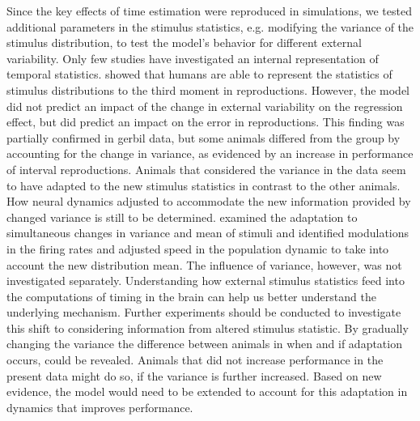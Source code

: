 \documentclass[10pt]{article}
\begin{document}
Since the key effects of time estimation were reproduced in simulations, we tested additional parameters in the stimulus statistics, e.g. modifying the variance of the stimulus distribution, to test the model's behavior for different external variability.
Only few studies have investigated an internal representation of temporal statistics. \cite{Acerbi2012} showed that humans are able to represent the statistics of stimulus distributions to the third moment in reproductions.  
However, the model did not predict an impact of the change in external variability on the regression effect, but did predict an impact on the error in reproductions.
This finding was partially confirmed in gerbil data, but some animals differed from the group by accounting for the change in variance, as evidenced by an increase in performance of interval reproductions.
Animals that considered the variance in the data seem to have adapted to the new stimulus statistics in contrast to the other animals. 
How neural dynamics adjusted to accommodate the new information provided by changed variance is still to be determined.
\cite{Meirhaeghe2021} examined the adaptation to simultaneous changes in variance and mean of stimuli and identified modulations in the firing rates and adjusted speed in the population dynamic to take into account the new distribution mean. The influence of variance, however, was not investigated separately. 
Understanding how external stimulus statistics feed into the computations of timing in the brain can help us better understand the underlying mechanism. 
Further experiments should be conducted to investigate this shift to considering information from altered stimulus statistic. By gradually changing the variance the difference between animals in when and if adaptation occurs, could be revealed. 
Animals that did not increase performance in the present data might do so, if the variance is further increased.
Based on new evidence, the model would need to be extended to account for this adaptation in dynamics that improves performance.
\end{document}
